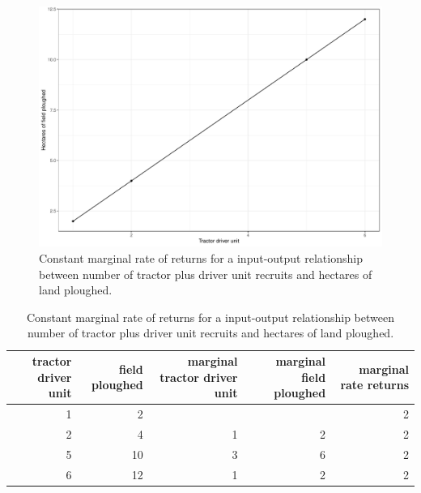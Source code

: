 \documentclass[12pt,ignorenonframetext,aspectratio=169]{beamer}
\begin{document}
\begin{frame}{}
\protect\hypertarget{section-3}{}
\begin{figure}
\includegraphics[width=0.45\linewidth]{production_relationship_files/figure-beamer/tractor-driver-unit-cmr-fig-1} \caption{Constant marginal rate of returns for a input-output relationship between number of tractor plus driver unit recruits and hectares of land ploughed.}\label{fig:tractor-driver-unit-cmr-fig}
\end{figure}
\end{frame}

\begin{frame}{}
\protect\hypertarget{section-4}{}
\begin{table}

\caption{\label{tab:tractor-driver-unit-cmr-tab}Constant marginal rate of returns for a input-output relationship between number of tractor plus driver unit recruits and hectares of land ploughed.}
\centering
\fontsize{6}{8}\selectfont
\begin{tabular}[t]{rrrrr}
\toprule
tractor driver unit & field ploughed & marginal tractor driver unit & marginal field ploughed & marginal rate returns\\
\midrule
1 & 2 &  &  & 2\\
2 & 4 & 1 & 2 & 2\\
5 & 10 & 3 & 6 & 2\\
6 & 12 & 1 & 2 & 2\\
\bottomrule
\end{tabular}
\end{table}
\end{frame}
\end{document}

